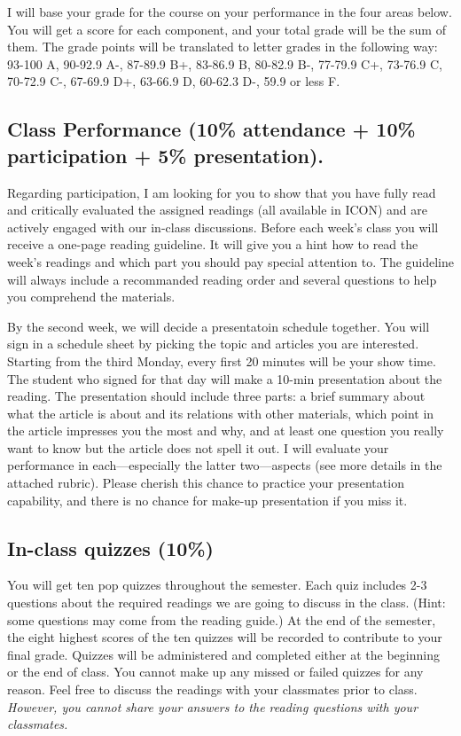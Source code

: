 \documentclass[11pt,]{article}
\theoremstyle{definition}
\theoremstyle{definition}
\theoremstyle{remark}
\begin{document}
I will base your grade for the course on your performance in the four
areas below. You will get a score for each component, and your total
grade will be the sum of them. The grade points will be translated to
letter grades in the following way: 93-100 A, 90-92.9 A-, 87-89.9 B+,
83-86.9 B, 80-82.9 B-, 77-79.9 C+, 73-76.9 C, 70-72.9 C-, 67-69.9 D+,
63-66.9 D, 60-62.3 D-, 59.9 or less F.

\subsection{Class Performance (10\% attendance + 10\% participation +
5\%
presentation).}\label{class-performance-10-attendance-10-participation-5-presentation.}

Regarding participation, I am looking for you to show that you have
fully read and critically evaluated the assigned readings (all available
in ICON) and are actively engaged with our in-class discussions. Before
each week's class you will receive a one-page reading guideline. It will
give you a hint how to read the week's readings and which part you
should pay special attention to. The guideline will always include a
recommanded reading order and several questions to help you comprehend
the materials.

By the second week, we will decide a presentatoin schedule together. You
will sign in a schedule sheet by picking the topic and articles you are
interested. Starting from the third Monday, every first 20 minutes will
be your show time. The student who signed for that day will make a
10-min presentation about the reading. The presentation should include
three parts: a brief summary about what the article is about and its
relations with other materials, which point in the article impresses you
the most and why, and at least one question you really want to know but
the article does not spell it out. I will evaluate your performance in
each---especially the latter two---aspects (see more details in the
attached rubric). Please cherish this chance to practice your
presentation capability, and there is no chance for make-up presentation
if you miss it.

\subsection{In-class quizzes (10\%)}\label{in-class-quizzes-10}

You will get ten pop quizzes throughout the semester. Each quiz includes
2-3 questions about the required readings we are going to discuss in the
class. (Hint: some questions may come from the reading guide.) At the
end of the semester, the eight highest scores of the ten quizzes will be
recorded to contribute to your final grade. Quizzes will be administered
and completed either at the beginning or the end of class. You cannot
make up any missed or failed quizzes for any reason. Feel free to
discuss the readings with your classmates prior to class. \emph{However,
you cannot share your answers to the reading questions with your
classmates.}
\end{document}

